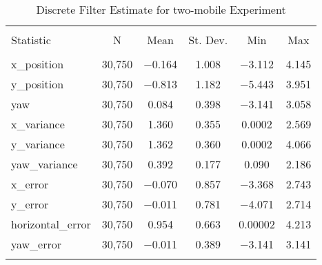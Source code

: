 
\begin{table}[h] \centering 
  \caption{Discrete Filter Estimate for two-mobile Experiment} 
  \label{tab:two_mobile_discrete_summary} 
\begin{tabular}{@{\extracolsep{5pt}}lccccc} 
\\[-1.8ex]\hline 
\hline \\[-1.8ex] 
Statistic & \multicolumn{1}{c}{N} & \multicolumn{1}{c}{Mean} & \multicolumn{1}{c}{St. Dev.} & \multicolumn{1}{c}{Min} & \multicolumn{1}{c}{Max} \\ 
\hline \\[-1.8ex] 
x\_position & 30,750 & $-$0.164 & \num{1.008} & $-$3.112 & \num{4.145} \\ 
y\_position & 30,750 & $-$0.813 & \num{1.182} & $-$5.443 & \num{3.951} \\ 
yaw & 30,750 & \num{0.084} & \num{0.398} & $-$3.141 & \num{3.058} \\ 
x\_variance & 30,750 & \num{1.360} & \num{0.355} & \num{0.0002} & \num{2.569} \\ 
y\_variance & 30,750 & \num{1.362} & \num{0.360} & \num{0.0002} & \num{4.066} \\ 
yaw\_variance & 30,750 & \num{0.392} & \num{0.177} & \num{0.090} & \num{2.186} \\ 
x\_error & 30,750 & $-$0.070 & \num{0.857} & $-$3.368 & \num{2.743} \\ 
y\_error & 30,750 & $-$0.011 & \num{0.781} & $-$4.071 & \num{2.714} \\ 
horizontal\_error & 30,750 & \num{0.954} & \num{0.663} & \num{0.00002} & \num{4.213} \\ 
yaw\_error & 30,750 & $-$0.011 & \num{0.389} & $-$3.141 & \num{3.141} \\ 
\hline \\[-1.8ex] 
\end{tabular} 
\end{table} 
